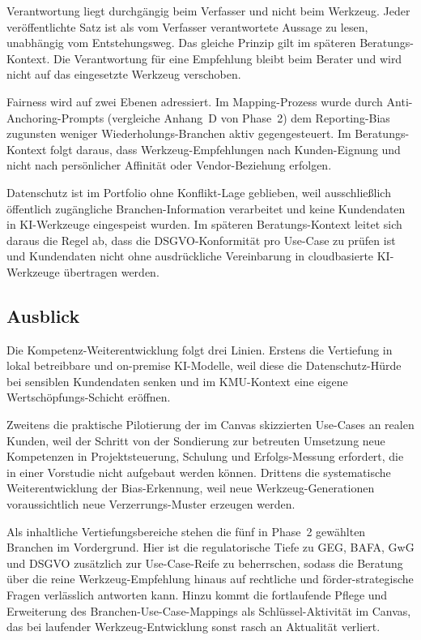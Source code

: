 \documentclass[a4paper,11pt]{article}
\begin{document}
Verantwortung liegt durchgängig beim Verfasser und nicht beim Werkzeug.
Jeder veröffentlichte Satz ist als vom Verfasser verantwortete Aussage
zu lesen, unabhängig vom Entstehungsweg. Das gleiche Prinzip
gilt im späteren Beratungs-Kontext. Die Verantwortung für eine
Empfehlung bleibt beim Berater und wird nicht auf das eingesetzte
Werkzeug verschoben.

Fairness wird auf zwei Ebenen adressiert. Im Mapping-Prozess wurde
durch Anti-Anchoring-Prompts (vergleiche Anhang~D von Phase~2) dem
Reporting-Bias zugunsten weniger Wiederholungs-Branchen aktiv
gegengesteuert. Im Beratungs-Kontext folgt daraus, dass
Werkzeug-Empfehlungen nach Kunden-Eignung und nicht nach
persönlicher Affinität oder Vendor-Beziehung erfolgen.

Datenschutz ist im Portfolio ohne Konflikt-Lage geblieben, weil
ausschließlich öffentlich zugängliche Branchen-Information verarbeitet
und keine Kundendaten in KI-Werkzeuge eingespeist wurden. Im
späteren Beratungs-Kontext leitet sich daraus die Regel ab, dass die
DSGVO-Konformität pro Use-Case zu prüfen ist und Kundendaten nicht
ohne ausdrückliche Vereinbarung in cloudbasierte KI-Werkzeuge
übertragen werden.

\subsection{Ausblick}

Die Kompetenz-Weiterentwicklung folgt drei Linien. Erstens die
Vertiefung in lokal betreibbare und on-premise KI-Modelle, weil diese
die Datenschutz-Hürde bei sensiblen Kundendaten senken und im
KMU-Kontext eine eigene Wertschöpfungs-Schicht eröffnen.

Zweitens die praktische Pilotierung der im Canvas skizzierten
Use-Cases an realen Kunden, weil der Schritt von der Sondierung zur
betreuten Umsetzung neue Kompetenzen in Projektsteuerung, Schulung und
Erfolgs-Messung erfordert, die in einer Vorstudie nicht aufgebaut
werden können. Drittens die systematische Weiterentwicklung der
Bias-Erkennung, weil neue Werkzeug-Generationen voraussichtlich neue
Verzerrungs-Muster erzeugen werden.

Als inhaltliche Vertiefungsbereiche stehen die fünf in Phase~2
gewählten Branchen im Vordergrund. Hier ist die regulatorische Tiefe
zu GEG, BAFA, GwG und DSGVO zusätzlich zur Use-Case-Reife zu
beherrschen, sodass die Beratung über die reine Werkzeug-Empfehlung
hinaus auf rechtliche und förder-strategische Fragen verlässlich
antworten kann. Hinzu kommt die fortlaufende Pflege und Erweiterung
des Branchen-Use-Case-Mappings als Schlüssel-Aktivität im Canvas, das
bei laufender Werkzeug-Entwicklung sonst rasch an Aktualität verliert.
\end{document}
